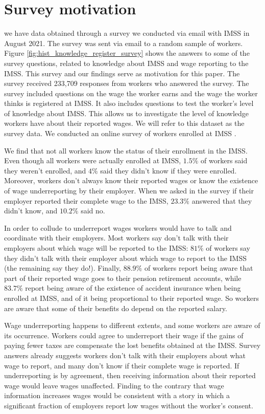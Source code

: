 \documentclass[oneside,11pt]{article}
\begin{document}
\section{Survey motivation}

we have data obtained through a survey we conducted via email with IMSS in August 2021. The survey was sent via email to a random sample of workers. Figure \ref{fig:hist_knowledge_register_survey} shows the answers to some of the survey questions, related to knowledge about IMSS and wage reporting to the IMSS. This survey and our findings serve as motivation for this paper. The survey received 233,709 responses from workers who answered the survey. The survey included questions on the wage the worker earns and the wage the worker thinks is registered at IMSS. It also includes questions to test the worker's level of knowledge about IMSS. This allows us to investigate the level of knowledge workers have about their reported wages. We will refer to this dataset as the survey data. 
We conducted an online survey of workers enrolled at IMSS . 

We find that not all workers know the status of their enrollment in the IMSS. Even though all workers were actually enrolled at IMSS, $1.5\%$ of workers said they weren't enrolled, and $4\%$ said they didn't know if they were enrolled. Moreover, workers don't always know their reported wages or know the existence of wage underreporting by their employer. When we asked in the survey if their employer reported their complete wage to the IMSS, $23.3\%$ answered that they didn't know, and $10.2\%$ said no.

In order to collude to underreport wages workers would have to talk and coordinate with their employers. Most workers say don't talk with their employers about which wage will be reported to the IMSS: $81\%$ of workers say they didn't talk with their employer about which wage to report to the IMSS (the remaining say they do!). Finally,  $88.9\%$ of workers  report being aware that part of their reported wage goes to their pension retirement accounts, while $83.7\%$ report being aware of the existence of accident insurance when being enrolled at IMSS, and of it being proportional to their reported wage. So workers are aware that some of their benefits do depend on the reported salary.

Wage underreporting happens to different extents, and some workers are aware of its occurrence. Workers could agree to underreport their wage if the gains of paying fewer taxes are compensate the lost benefits obtained at the IMSS. Survey answers already suggests  workers don't talk with their employers about what wage to report, and many don't know if their complete wage is reported. If underreporting is by agreement, then receiving information about their reported wage would leave wages unaffected. Finding to the contrary that wage information increases wages would be consistent with a story in which a significant fraction of employers report low wages without the worker's consent. 
\end{document}
